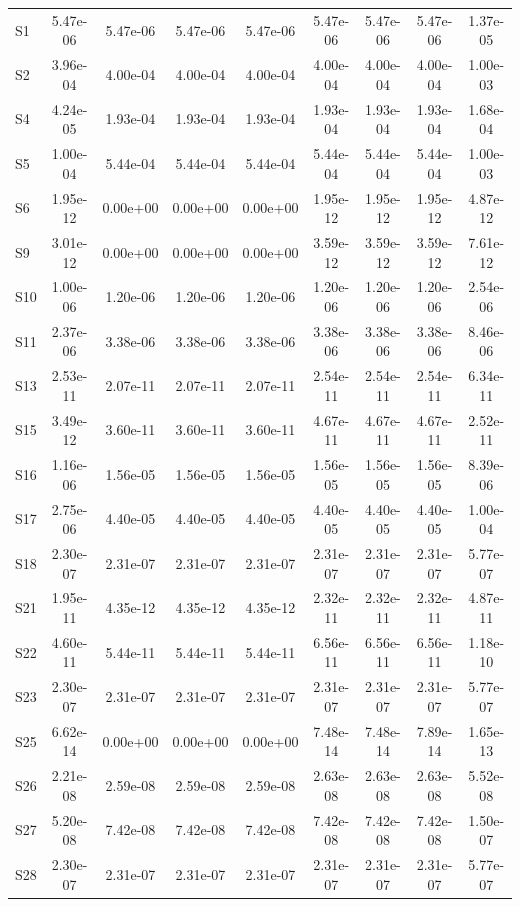 {\begin{longtable}{l S[table-format=1.2e+2] S[table-format=1.2e+2] S[table-format=1.2e+2] S[table-format=1.2e+2] S[table-format=1.2e+2] S[table-format=1.2e+2] S[table-format=1.2e+2] S[table-format=1.2e+2]}
S1 & 5.47e-06 & 5.47e-06 & 5.47e-06 & 5.47e-06 & 5.47e-06 & 5.47e-06 & 5.47e-06 & 1.37e-05 \\
S2 & 3.96e-04 & 4.00e-04 & 4.00e-04 & 4.00e-04 & 4.00e-04 & 4.00e-04 & 4.00e-04 & 1.00e-03 \\
S4 & 4.24e-05 & 1.93e-04 & 1.93e-04 & 1.93e-04 & 1.93e-04 & 1.93e-04 & 1.93e-04 & 1.68e-04 \\
S5 & 1.00e-04 & 5.44e-04 & 5.44e-04 & 5.44e-04 & 5.44e-04 & 5.44e-04 & 5.44e-04 & 1.00e-03 \\
S6 & 1.95e-12 & 0.00e+00 & 0.00e+00 & 0.00e+00 & 1.95e-12 & 1.95e-12 & 1.95e-12 & 4.87e-12 \\
S9 & 3.01e-12 & 0.00e+00 & 0.00e+00 & 0.00e+00 & 3.59e-12 & 3.59e-12 & 3.59e-12 & 7.61e-12 \\
S10 & 1.00e-06 & 1.20e-06 & 1.20e-06 & 1.20e-06 & 1.20e-06 & 1.20e-06 & 1.20e-06 & 2.54e-06 \\
S11 & 2.37e-06 & 3.38e-06 & 3.38e-06 & 3.38e-06 & 3.38e-06 & 3.38e-06 & 3.38e-06 & 8.46e-06 \\
S13 & 2.53e-11 & 2.07e-11 & 2.07e-11 & 2.07e-11 & 2.54e-11 & 2.54e-11 & 2.54e-11 & 6.34e-11 \\
S15 & 3.49e-12 & 3.60e-11 & 3.60e-11 & 3.60e-11 & 4.67e-11 & 4.67e-11 & 4.67e-11 & 2.52e-11 \\
S16 & 1.16e-06 & 1.56e-05 & 1.56e-05 & 1.56e-05 & 1.56e-05 & 1.56e-05 & 1.56e-05 & 8.39e-06 \\
S17 & 2.75e-06 & 4.40e-05 & 4.40e-05 & 4.40e-05 & 4.40e-05 & 4.40e-05 & 4.40e-05 & 1.00e-04 \\
S18 & 2.30e-07 & 2.31e-07 & 2.31e-07 & 2.31e-07 & 2.31e-07 & 2.31e-07 & 2.31e-07 & 5.77e-07 \\
S21 & 1.95e-11 & 4.35e-12 & 4.35e-12 & 4.35e-12 & 2.32e-11 & 2.32e-11 & 2.32e-11 & 4.87e-11 \\
S22 & 4.60e-11 & 5.44e-11 & 5.44e-11 & 5.44e-11 & 6.56e-11 & 6.56e-11 & 6.56e-11 & 1.18e-10 \\
S23 & 2.30e-07 & 2.31e-07 & 2.31e-07 & 2.31e-07 & 2.31e-07 & 2.31e-07 & 2.31e-07 & 5.77e-07 \\
S25 & 6.62e-14 & 0.00e+00 & 0.00e+00 & 0.00e+00 & 7.48e-14 & 7.48e-14 & 7.89e-14 & 1.65e-13 \\
S26 & 2.21e-08 & 2.59e-08 & 2.59e-08 & 2.59e-08 & 2.63e-08 & 2.63e-08 & 2.63e-08 & 5.52e-08 \\
S27 & 5.20e-08 & 7.42e-08 & 7.42e-08 & 7.42e-08 & 7.42e-08 & 7.42e-08 & 7.42e-08 & 1.50e-07 \\
S28 & 2.30e-07 & 2.31e-07 & 2.31e-07 & 2.31e-07 & 2.31e-07 & 2.31e-07 & 2.31e-07 & 5.77e-07 \\

\end{longtable}}
